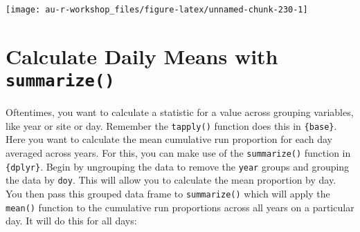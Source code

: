 \documentclass[]{book}
\newenvironment{Shaded}{\begin{snugshade}}{\end{snugshade}}
\newcommand{\KeywordTok}[1]{\textcolor[rgb]{0.13,0.29,0.53}{\textbf{#1}}}
\newcommand{\DataTypeTok}[1]{\textcolor[rgb]{0.13,0.29,0.53}{#1}}
\newcommand{\DecValTok}[1]{\textcolor[rgb]{0.00,0.00,0.81}{#1}}
\newcommand{\StringTok}[1]{\textcolor[rgb]{0.31,0.60,0.02}{#1}}
\newcommand{\CommentTok}[1]{\textcolor[rgb]{0.56,0.35,0.01}{\textit{#1}}}
\newcommand{\ControlFlowTok}[1]{\textcolor[rgb]{0.13,0.29,0.53}{\textbf{#1}}}
\newcommand{\OperatorTok}[1]{\textcolor[rgb]{0.81,0.36,0.00}{\textbf{#1}}}
\newcommand{\NormalTok}[1]{#1}
\theoremstyle{definition}
\theoremstyle{definition}
\theoremstyle{definition}
\theoremstyle{remark}
\begin{document}
\begin{Shaded}
\end{Shaded}

\begin{center}\texttt{[image: au-r-workshop\_files/figure-latex/unnamed-chunk-230-1]} \end{center}

\section{\texorpdfstring{Calculate Daily Means with
\texttt{summarize()}}{Calculate Daily Means with summarize()}}\label{calculate-daily-means-with-summarize}

Oftentimes, you want to calculate a statistic for a value across
grouping variables, like year or site or day. Remember the
\texttt{tapply()} function does this in \texttt{\{base\}}. Here you want
to calculate the mean cumulative run proportion for each day averaged
across years. For this, you can make use of the \texttt{summarize()}
function in \texttt{\{dplyr\}}. Begin by ungrouping the data to remove
the \texttt{year} groups and grouping the data by \texttt{doy}. This
will allow you to calculate the mean proportion by day. You then pass
this grouped data frame to \texttt{summarize()} which will apply the
\texttt{mean()} function to the cumulative run proportions across all
years on a particular day. It will do this for all days:
\end{document}
